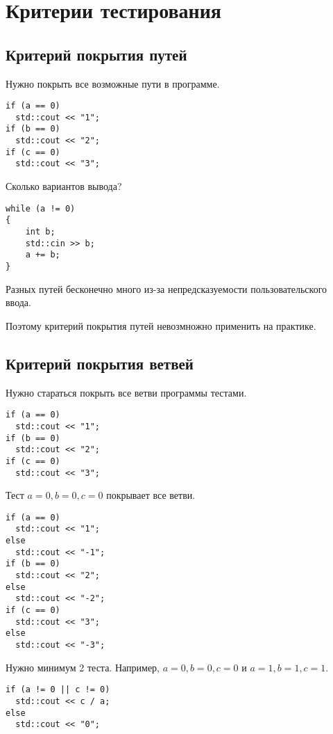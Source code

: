 \documentclass[14pt,openany]{book}
\begin{document}
\section{Критерии тестирования}

\subsection{Критерий покрытия путей}

Нужно покрыть все возможные пути в программе. 

\begin{lstlisting}
if (a == 0)
  std::cout << "1";
if (b == 0)
  std::cout << "2";
if (c == 0)
  std::cout << "3";
\end{lstlisting}

Сколько вариантов вывода?

\begin{lstlisting}
while (a != 0)
{
    int b;
    std::cin >> b;
    a += b;
}
\end{lstlisting}

Разных путей бесконечно много из-за непредсказуемости пользовательского ввода.

Поэтому критерий покрытия путей невозмножно применить на практике.

\subsection{Критерий покрытия ветвей}

Нужно стараться покрыть все ветви программы тестами.

\begin{lstlisting}
if (a == 0)
  std::cout << "1";
if (b == 0)
  std::cout << "2";
if (c == 0)
  std::cout << "3";
\end{lstlisting}

Тест $a=0, b=0, c=0$ покрывает все ветви.


\begin{lstlisting}
if (a == 0)
  std::cout << "1";
else
  std::cout << "-1";
if (b == 0)
  std::cout << "2";
else
  std::cout << "-2";
if (c == 0)
  std::cout << "3";
else
  std::cout << "-3";
\end{lstlisting}

Нужно минимум 2 теста. Например, $a=0, b=0, c=0$ и $a=1, b=1, c=1$.

\begin{lstlisting}
if (a != 0 || c != 0)
  std::cout << c / a;
else
  std::cout << "0";
\end{lstlisting}
\end{document}
